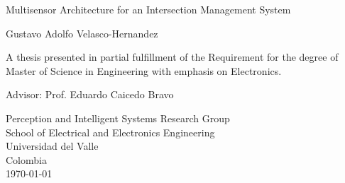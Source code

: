 \begin{titlepage}
    \begin{center}
        \vspace*{1cm}
        \Huge        
        Multisensor Architecture for an Intersection Management System
   
        \vspace{3.5cm}
        \LARGE
        Gustavo Adolfo Velasco-Hernandez
        
        \vfill
        \large
		        
        
        A thesis presented in partial fulfillment of the Requirement for the degree of Master of Science in Engineering with emphasis on Electronics.
        
        \vspace{2cm}
        
        Advisor: Prof. Eduardo Caicedo Bravo
		
		\vspace{2cm}
        
        Perception and Intelligent Systems Research Group \\
        School of Electrical and Electronics Engineering\\
        Universidad del Valle\\
        Colombia\\
        \today
        
    \end{center}
\end{titlepage}